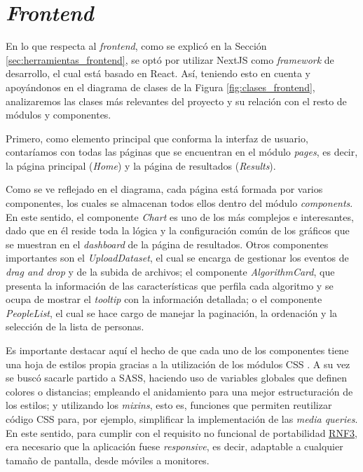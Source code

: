 \section{\textit{Frontend}}

En lo que respecta al \textit{frontend}, como se explicó en la Sección \ref{sec:herramientas_frontend}, se optó
por utilizar NextJS como \textit{framework} de desarrollo, el cual está basado en React. Así, teniendo esto en cuenta y apoyándonos
en el diagrama de clases de la Figura \ref{fig:clases_frontend}, analizaremos
las clases más relevantes del proyecto y su relación con el resto de módulos y componentes.

\bigskip
Primero, como elemento principal que conforma la interfaz de usuario, contaríamos con todas las páginas que se encuentran en el módulo \textit{pages}, es decir,
la página principal (\textit{Home}) y la página de resultados (\textit{Results}).

\bigskip
Como se ve reflejado en el diagrama, cada página está formada por varios componentes, los cuales se almacenan todos ellos dentro del módulo \textit{components}.
En este sentido, el componente \textit{Chart} es uno de los más complejos e interesantes, dado que en él reside toda la lógica y la configuración común
de los gráficos que se muestran en el \textit{dashboard} de la página de resultados. Otros componentes importantes son el \textit{UploadDataset},
el cual se encarga de gestionar los eventos de \textit{drag and drop} y de la subida de archivos; el componente \textit{AlgorithmCard}, que
presenta la información de las características que perfila cada algoritmo y se ocupa de mostrar el \textit{tooltip} con la información detallada;
o el componente \textit{PeopleList}, el cual se hace cargo de manejar la paginación, la ordenación y la selección de la lista de personas.

\bigskip
Es importante
destacar aquí el hecho de que cada uno de los componentes tiene una hoja de estilos propia gracias a la utilización de los módulos CSS \cite{cssmodules}. A su vez
se buscó sacarle partido a SASS, haciendo uso de variables globales que definen colores o distancias; empleando el anidamiento para una mejor
estructuración de los estilos; y utilizando los \textit{mixins}, esto es, funciones que permiten reutilizar código CSS para, por ejemplo, simplificar la implementación de las \textit{media queries}. En este
sentido, para cumplir con el requisito no funcional de portabilidad \hyperref[req:rnf3]{RNF3},
era necesario que la aplicación fuese \textit{responsive}, es decir, adaptable a cualquier tamaño de pantalla, desde móviles a monitores.

